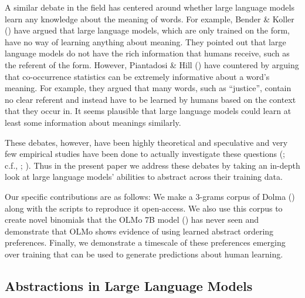\documentclass[
  nottoc]{article}
\begin{document}
A similar debate in the field has centered around whether large language
models learn any knowledge about the meaning of words. For example,
Bender \& Koller () have argued
that large language models, which are only trained on the form, have no
way of learning anything about meaning. They pointed out that large
language models do not have the rich information that humans receive,
such as the referent of the form. However, Piantadosi \& Hill
() have
countered by arguing that co-occurrence statistics can be extremely
informative about a word's meaning. For example, they argued that many
words, such as ``justice'', contain no clear referent and instead have
to be learned by humans based on the context that they occur in. It
seems plausible that large language models could learn at least some
information about meanings similarly.

These debates, however, have been highly theoretical and speculative and
very few empirical studies have been done to actually investigate these
questions (; c.f.,
;
). Thus in the present
paper we address these debates by taking an in-depth look at large
language models' abilities to abstract across their training data.

Our specific contributions are as follows: We make a 3-grams corpus of
Dolma () along with the scripts to reproduce it open-access. We also use
this corpus to create novel binomials that the OLMo 7B model
() has never seen and demonstrate that OLMo shows evidence of using
learned abstract ordering preferences. Finally, we demonstrate a
timescale of these preferences emerging over training that can be used
to generate predictions about human learning.

\subsection{Abstractions in Large Language
Models}\label{abstractions-in-large-language-models}
\end{document}
